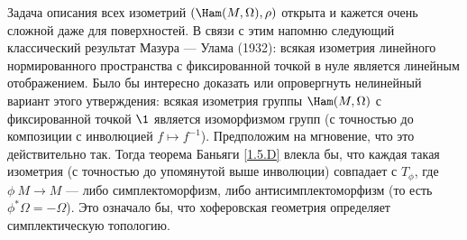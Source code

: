 Задача описания всех изометрий $(\Ham(M,\Omega), \rho)$ открыта и
кажется очень сложной даже для поверхностей. 
В связи с этим напомню следующий классический результат Мазура — Улама \cite{MU} (1932): всякая
изометрия линейного нормированного пространства с фиксированной точкой
в нуле является линейным отображением. 
Было бы интересно доказать или опровергнуть нелинейный вариант этого
утверждения: всякая изометрия группы $\Ham(M,\Omega)$ с фиксированной
точкой $\1$ является изоморфизмом групп (с точностью до композиции с
инволюцией $f\mapsto f^{-1}$). 
Предположим на мгновение, что это действительно так.
Тогда теорема Баньяги \ref{1.5.D} влекла бы, что
каждая такая изометрия (с точностью до упомянутой выше инволюции)
совпадает с $T_\phi$, где $\phi\: M \to M$ — либо симплектоморфизм,
либо антисимплектоморфизм (то есть $\phi^\ast\Omega = -\Omega$).
Это означало бы, что хоферовская геометрия определяет симплектическую топологию.
